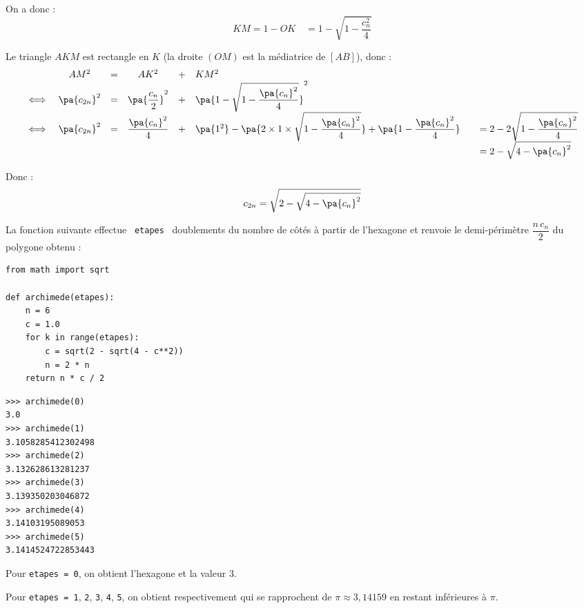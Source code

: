 \begin{demonstration}
	On a donc :
	\[
		KM = 1 - OK \quad = 1 -\sqrt{1 - \dfrac{c_n^2}{4}}
	\]

	Le triangle $AKM$ est rectangle en $K$ (la droite $(OM)$ est la médiatrice de $[AB]$), donc :
	\[
		\begin{array}{rccccll}
			     & AM^2          & = & AK^2                  & + & KM^2                                                                                              &                                             \\
			\iff & \pa{c_{2n}}^2 & = & \pa{\dfrac{c_n}{2}}^2 & + & \pa{1 -\sqrt{1 - \dfrac{\pa{c_n}^2}{4}}}^2                                                        &                                             \\
			\iff & \pa{c_{2n}}^2 & = & \dfrac{\pa{c_n}^2}{4} & + & \pa{1^2} - \pa{2\times 1\times \sqrt{1 - \dfrac{\pa{c_n}^2}{4}}} + \pa{1 - \dfrac{\pa{c_n}^2}{4}} & \quad = 2 - 2\sqrt{1-\dfrac{\pa{c_n}^2}{4}} \\
			     &               &   &                       &   &                                                                                                   & \quad = 2 - \sqrt{4-\pa{c_n}^2}
		\end{array}
	\]

	Donc :
	\[
		c_{2n} = \sqrt{2 - \sqrt{4-\pa{c_n}^2}}
	\]

\end{demonstration}

\begin{methode}
	La fonction suivante effectue ~\texttt{etapes}~ doublements du nombre de côtés à partir de l'hexagone et renvoie le demi-périmètre $\dfrac{n\,c_n}{2}$ du polygone obtenu :

	\ms

	\begin{lstlisting}
from math import sqrt

def archimede(etapes):
    n = 6
    c = 1.0
    for k in range(etapes):
        c = sqrt(2 - sqrt(4 - c**2))
        n = 2 * n
    return n * c / 2
\end{lstlisting}

	\begin{lstlisting}
>>> archimede(0)
3.0
>>> archimede(1)
3.1058285412302498
>>> archimede(2)
3.132628613281237
>>> archimede(3)
3.139350203046872
>>> archimede(4)
3.14103195089053
>>> archimede(5)
3.1414524722853443
\end{lstlisting}

	Pour \texttt{etapes = 0}, on obtient l'hexagone et la valeur $3$.

	Pour \texttt{etapes = 1}, \texttt{2}, \texttt{3}, \texttt{4}, \texttt{5}, on obtient respectivement qui se rapprochent de $\pi \approx 3{,}14159$ en restant inférieures à $\pi$.
\end{methode}

